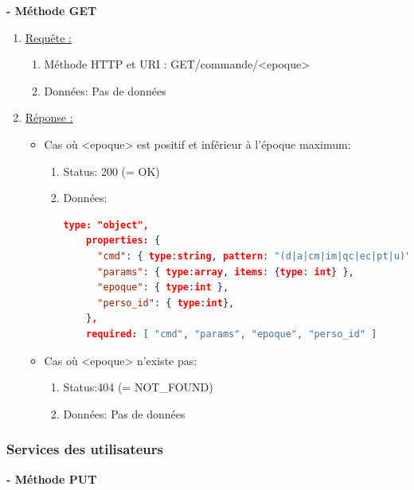 \documentclass[11pt, a4paper]{article}
\begin{document}
  \newpage
  \textbf{- Méthode GET }
  
  \begin{enumerate}
   \item \underline{Requête :}
    \begin{enumerate}
     \item Méthode HTTP et URI : GET/commande/<epoque>
     \item Données: Pas de données
	     
    \end{enumerate}

   \item \underline{Réponse :}
   \begin{itemize}
    \item Cas où <epoque> est positif et inférieur à l'époque maximum:
    \begin{enumerate}
     \item Status: 200 (= OK)
     \item Données:
	\begin{lstlisting}[language=JSON]
	type: "object",
	properties: {
	  "cmd": { type:string, pattern: "(d|a|cm|im|qc|ec|pt|u)" },
	  "params": { type:array, items: {type: int} },
	  "epoque": { type:int },
	  "perso_id": { type:int},
	},
	required: [ "cmd", "params", "epoque", "perso_id" ]
	\end{lstlisting} 
    \end{enumerate}

    \item Cas où <epoque> n'existe pas:
    \begin{enumerate}
     \item Status:404 (= NOT\_FOUND)
     \item Données: Pas de données
    \end{enumerate}
    
   \end{itemize}

  \end{enumerate}
  
  \subsubsection{Services des utilisateurs}
  \textbf{- Méthode PUT}
  
\end{document}
